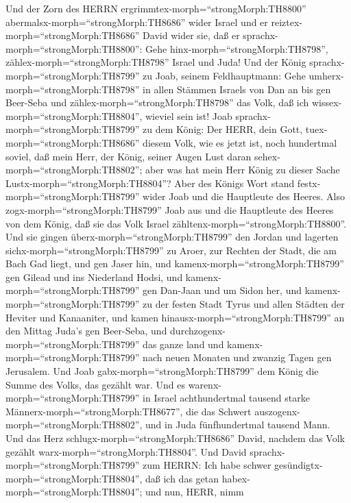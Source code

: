  Und der Zorn des HERRN
ergrimmtex-morph=``strongMorph:TH8800''
abermalsx-morph=``strongMorph:TH8686'' wider Israel und er
reiztex-morph=``strongMorph:TH8686'' David wider sie, daß er
sprachx-morph=``strongMorph:TH8800'': Gehe
hinx-morph=``strongMorph:TH8798'', zählex-morph=``strongMorph:TH8798''
Israel und Juda!  Und der König
sprachx-morph=``strongMorph:TH8799'' zu Joab, seinem Feldhauptmann: Gehe
umherx-morph=``strongMorph:TH8798'' in allen Stämmen Israels von Dan an
bis gen Beer-Seba und zählex-morph=``strongMorph:TH8798'' das Volk, daß
ich wissex-morph=``strongMorph:TH8804'', wieviel sein ist! 
Joab sprachx-morph=``strongMorph:TH8799'' zu dem König: Der HERR, dein
Gott, tuex-morph=``strongMorph:TH8686'' diesem Volk, wie es jetzt ist,
noch hundertmal soviel, daß mein Herr, der König, seiner Augen Lust
daran sehex-morph=``strongMorph:TH8802''; aber was hat mein Herr König
zu dieser Sache Lustx-morph=``strongMorph:TH8804''?  Aber
des Königs Wort stand festx-morph=``strongMorph:TH8799'' wider Joab und
die Hauptleute des Heeres. Also zogx-morph=``strongMorph:TH8799'' Joab
aus und die Hauptleute des Heeres von dem König, daß sie das Volk Israel
zähltenx-morph=``strongMorph:TH8800''.  Und sie gingen
überx-morph=``strongMorph:TH8799'' den Jordan und lagerten
sichx-morph=``strongMorph:TH8799'' zu Aroer, zur Rechten der Stadt, die
am Bach Gad liegt, und gen Jaser hin,  und
kamenx-morph=``strongMorph:TH8799'' gen Gilead und ins Niederland Hodsi,
und kamenx-morph=``strongMorph:TH8799'' gen Dan-Jaan und um Sidon her,
 und kamenx-morph=``strongMorph:TH8799'' zu der festen Stadt
Tyrus und allen Städten der Heviter und Kanaaniter, und kamen
hinausx-morph=``strongMorph:TH8799'' an den Mittag Juda's gen Beer-Seba,
 und durchzogenx-morph=``strongMorph:TH8799'' das ganze land
und kamenx-morph=``strongMorph:TH8799'' nach neuen Monaten und zwanzig
Tagen gen Jerusalem.  Und Joab
gabx-morph=``strongMorph:TH8799'' dem König die Summe des Volks, das
gezählt war. Und es warenx-morph=``strongMorph:TH8799'' in Israel
achthundertmal tausend starke Männerx-morph=``strongMorph:TH8677'', die
das Schwert auszogenx-morph=``strongMorph:TH8802'', und in Juda
fünfhundertmal tausend Mann.  Und das Herz
schlugx-morph=``strongMorph:TH8686'' David, nachdem das Volk gezählt
warx-morph=``strongMorph:TH8804''. Und David
sprachx-morph=``strongMorph:TH8799'' zum HERRN: Ich habe schwer
gesündigtx-morph=``strongMorph:TH8804'', daß ich das getan
habex-morph=``strongMorph:TH8804''; und nun, HERR, nimm
